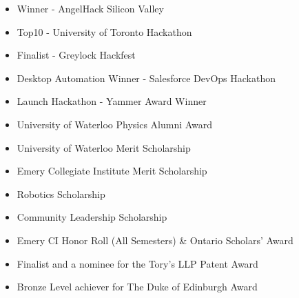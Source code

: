 \documentclass[10pt, oneside]{resume}                            %
\newcommand{\li}{-0.07 in}
\begin{document}
  \begin{itemize}
    \item {\normalsize{Winner - AngelHack Silicon Valley}}
    \vspace{\li}

    \item {\normalsize{Top10 - University of Toronto Hackathon}}
    \vspace{\li}

    \item {\normalsize{Finalist - Greylock Hackfest }}
    \vspace{\li}

    \item {\normalsize{Desktop Automation Winner - Salesforce DevOps Hackathon }}
    \vspace{\li}

    \item {\normalsize{Launch Hackathon - Yammer Award Winner }}
    \vspace{\li}

    \item {\normalsize{University of Waterloo Physics Alumni Award }}
    \vspace{\li}

    \item {\normalsize{University of Waterloo Merit Scholarship }}
    \vspace{\li}

    \item {\normalsize{Emery Collegiate Institute Merit Scholarship }}
    \vspace{\li}

    \item {\normalsize{Robotics Scholarship }}
    \vspace{\li}

    \item {\normalsize{Community Leadership Scholarship }}
    \vspace{\li}

    \item {\normalsize{Emery CI Honor Roll (All Semesters) \& Ontario Scholars’ Award }}
    \vspace{\li}

    \item {\normalsize{Finalist and a nominee for the Tory’s LLP Patent Award }}
    \vspace{\li}

    \item {\normalsize{Bronze Level achiever for The Duke of Edinburgh Award }}
    \vspace{\li}


\end{itemize}
\end{document}

